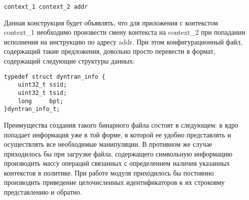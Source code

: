 \bigskip
\begin{lstlisting}
context_1 context_2 addr
\end{lstlisting}

\bigskip
Данная конструкция будет объявлять, что для приложения
с контекстом context\_1 необходимо произвести смену 
контекста на context\_2 при попадании исполнения на 
инструкцию по адресу addr. При этом конфигурационный 
файл, содержащий такие предложения, довольно просто перевести
в формат, содержащий следующие структуры данных: 

\bigskip 
\begin{lstlisting} 
typedef struct dyntran_info {
	uint32_t ssid;
	uint32_t tsid; 
	long 	 bpt;
}dyntran_info_t;
\end{lstlisting}

\bigskip
Преимущества создания такого бинарного файла состоят в следующем: 
в ядро попадает информация уже в той форме, в которой 
ее удобно представлять и осуществлять все необходимые 
манипуляции. В противном же случае приходилось бы при загрузке
файла, содержащего символьную информацию производить 
массу операций связанных с определением наличия указанных
контекстов в политике. При работе модуля приходилось бы 
постоянно производить приведение целочисленных идентификаторов
к их строковму представлению и обратно. 

